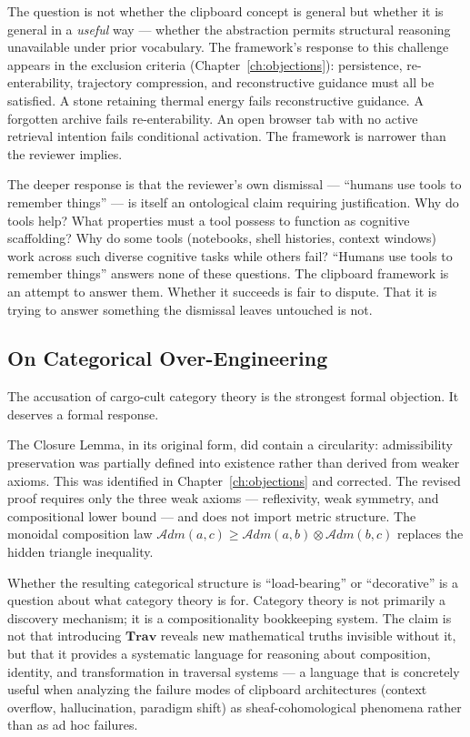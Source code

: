 \documentclass[12pt,oneside]{book}
\theoremstyle{plain}
\theoremstyle{definition}
\theoremstyle{plain}
\newcommand{\Trav}{\mathbf{Trav}}
\begin{document}
The question is not whether the clipboard concept is general but whether it is general in a \emph{useful} way — whether the abstraction permits structural reasoning unavailable under prior vocabulary. The framework's response to this challenge appears in the exclusion criteria (Chapter~\ref{ch:objections}): persistence, re-enterability, trajectory compression, and reconstructive guidance must all be satisfied. A stone retaining thermal energy fails reconstructive guidance. A forgotten archive fails re-enterability. An open browser tab with no active retrieval intention fails conditional activation. The framework is narrower than the reviewer implies.

The deeper response is that the reviewer's own dismissal — ``humans use tools to remember things'' — is itself an ontological claim requiring justification. Why do tools help? What properties must a tool possess to function as cognitive scaffolding? Why do some tools (notebooks, shell histories, context windows) work across such diverse cognitive tasks while others fail? ``Humans use tools to remember things'' answers none of these questions. The clipboard framework is an attempt to answer them. Whether it succeeds is fair to dispute. That it is trying to answer something the dismissal leaves untouched is not.

\subsection{On Categorical Over-Engineering}

The accusation of cargo-cult category theory is the strongest formal objection. It deserves a formal response.

The Closure Lemma, in its original form, did contain a circularity: admissibility preservation was partially defined into existence rather than derived from weaker axioms. This was identified in Chapter~\ref{ch:objections} and corrected. The revised proof requires only the three weak axioms — reflexivity, weak symmetry, and compositional lower bound — and does not import metric structure. The monoidal composition law $\mathcal{A}dm(a,c) \geq \mathcal{A}dm(a,b) \otimes \mathcal{A}dm(b,c)$ replaces the hidden triangle inequality.

Whether the resulting categorical structure is ``load-bearing'' or ``decorative'' is a question about what category theory is for. Category theory is not primarily a discovery mechanism; it is a compositionality bookkeeping system. The claim is not that introducing $\Trav$ reveals new mathematical truths invisible without it, but that it provides a systematic language for reasoning about composition, identity, and transformation in traversal systems — a language that is concretely useful when analyzing the failure modes of clipboard architectures (context overflow, hallucination, paradigm shift) as sheaf-cohomological phenomena rather than as ad hoc failures.
\end{document}
